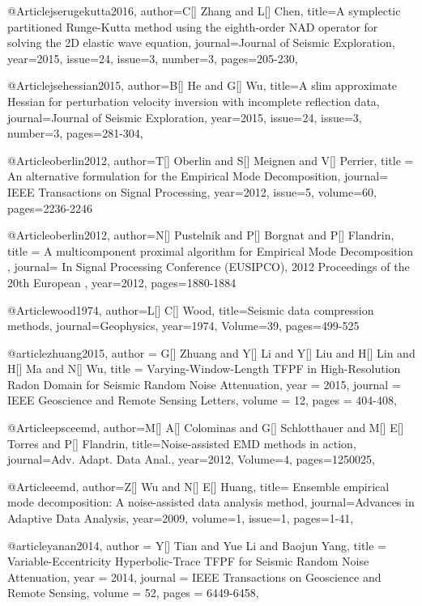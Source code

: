 @Article{jserugekutta2016,
  author={C[] Zhang and L[] Chen},
  title={A symplectic partitioned Runge-Kutta method using the eighth-order NAD operator for solving the 2D elastic wave equation},
  journal={Journal of Seismic Exploration},
  year=2015,
  issue=24,
  issue=3,
  number=3,
  pages={205-230},
}


@Article{jsehessian2015,
  author={B[] He and G[] Wu},
  title={A slim approximate Hessian for perturbation velocity inversion with incomplete reflection data},
  journal={Journal of Seismic Exploration},
  year=2015,
  issue=24,
  issue=3,
  number=3,
  pages={281-304},
}








@Article{oberlin2012,
  author={T[] Oberlin and S[] Meignen and V[] Perrier},
  title = { An alternative formulation for the Empirical Mode Decomposition},
  journal={ IEEE Transactions on Signal Processing},
  year=2012,
  issue=5,
  volume=60,
  pages=2236-2246}

@Article{oberlin2012,
  author={N[] Pustelnik and P[] Borgnat and P[] Flandrin},
  title = { A multicomponent proximal algorithm for Empirical Mode Decomposition },
  journal={  In Signal Processing Conference (EUSIPCO), 2012 Proceedings of the 20th European },
  year=2012,
  pages=1880-1884}
  
@Article{wood1974,
  author={L[] C[] Wood},
  title={Seismic data compression methods},
  journal={Geophysics},
  year=1974,
  Volume=39,
  pages={499-525}
}

@article{zhuang2015,
  author =	 {G[] Zhuang and Y[] Li and Y[] Liu and H[] Lin and H[] Ma and N[] Wu},
  title =	 {Varying-Window-Length {TFPF} in High-Resolution Radon Domain for Seismic Random Noise Attenuation},
  year =	 2015,
  journal =	 {IEEE Geoscience and Remote Sensing Letters},
  volume =	 12,
  pages =	 {404-408},
}

@Article{epsceemd,
  author={M[] A[] Colominas and G[] Schlotthauer and M[] E[] Torres and P[] Flandrin},
  title={Noise-assisted {EMD} methods in action},
  journal={Adv. Adapt. Data Anal.},
  year=2012,
  Volume=4,
  pages={1250025},
}

@Article{eemd,
  author={Z[] Wu and N[] E[] Huang},
  title={ Ensemble empirical mode decomposition: A noise-assisted data analysis method},
  journal={Advances in Adaptive Data Analysis},
  year=2009,
  volume=1,
  issue=1,
  pages={1-41},
}

@article{yanan2014,
  author =	 {Y[] Tian and Yue Li and Baojun Yang},
  title =	 {Variable-Eccentricity Hyperbolic-Trace {TFPF} for Seismic Random Noise Attenuation},
  year =	 2014,
  journal =	 {IEEE Transactions on Geoscience and Remote Sensing},
  volume =	 52,
  pages =	 {6449-6458},
}

